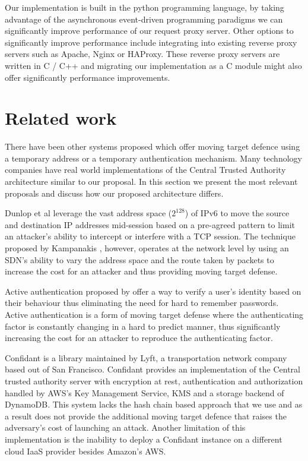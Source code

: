 \documentclass[a4paper,twoside]{article}
\begin{document}
Our implementation is built in the python programming language, by taking advantage of the asynchronous event-driven programming paradigms we can significantly improve performance \cite{kinder_event-driven_2005} of our request proxy server. Other options to significantly improve performance include integrating into existing reverse proxy servers such as Apache, Nginx or HAProxy. These reverse proxy servers are written in C / C++ and migrating our implementation as a C module might also offer significantly performance improvements. 

\section{Related work}

There have been other systems proposed which offer moving target defence using a temporary address or a temporary authentication mechanism. Many technology companies have real world implementations of the Central Trusted Authority architecture similar to our proposal. In this section we present the most relevant proposals and discuss how our proposed architecture differs. 

Dunlop et al \cite{dunlop_mt6d:_2011} leverage the vast address space ($2^{128}$) of IPv6 to move the source and destination IP addresses mid-session based on a pre-agreed pattern to limit an attacker's ability to intercept or interfere with a TCP session. The technique proposed by Kampanakis \cite{kampanakis_sdn-based_2014}, however, operates at the network level by using an SDN's ability to vary the address space and the route taken by packets to increase the cost for an attacker and thus providing moving target defense.

Active authentication proposed by \cite{yiu_authentication_2011,aksari_active_2009,li_active_2014} offer a way to verify a user's identity based on their behaviour thus eliminating the need for hard to remember passwords. Active authentication is a form of moving target defense where the authenticating factor is constantly changing in a hard to predict manner, thus significantly increasing the cost for an attacker to reproduce the authenticating factor.

Confidant \cite{lyft_confidant:_2015} is a library maintained by Lyft, a transportation network company based out of San Francisco. Confidant provides an implementation of the Central trusted authority server with encryption at rest, authentication and authorization handled by AWS's Key Management Service, KMS and a storage backend of DynamoDB.  This system lacks the hash chain based approach that we use and as a result does not provide the additional moving target defence that raises the adversary's cost of launching an attack. Another limitation of this implementation is the inability to deploy a Confidant instance on a different cloud IaaS provider besides Amazon's AWS. 
\end{document}
